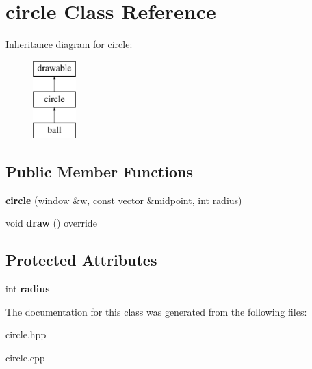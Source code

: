 \hypertarget{classcircle}{}\section{circle Class Reference}
\label{classcircle}
Inheritance diagram for circle\+:\begin{figure}[H]
\begin{center}
\leavevmode
\includegraphics[height=3.000000cm]{classcircle}
\end{center}
\end{figure}
\subsection*{Public Member Functions}
\begin{DoxyCompactItemize}
\item 
\mbox{\label{classcircle_a8c85ad1631a3919ae6971fe6effc0f60}} 
{\bfseries circle} (\hyperlink{classwindow}{window} \&w, const \hyperlink{classvector}{vector} \&midpoint, int radius)
\item 
\mbox{\label{classcircle_a7b75f2af355bab4f85ce878d513cccce}} 
void {\bfseries draw} () override
\end{DoxyCompactItemize}
\subsection*{Protected Attributes}
\begin{DoxyCompactItemize}
\item 
\mbox{\label{classcircle_a21c7b675591358ef27b64af21fae7b18}} 
int {\bfseries radius}
\end{DoxyCompactItemize}


The documentation for this class was generated from the following files\+:\begin{DoxyCompactItemize}
\item 
circle.\+hpp\item 
circle.\+cpp\end{DoxyCompactItemize}
